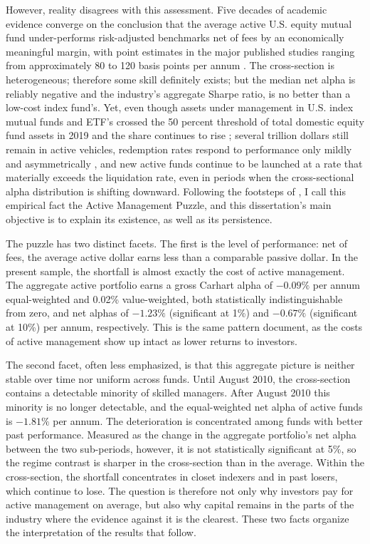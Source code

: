 \documentclass[12pt, oneside]{report}
\begin{document}
However, reality disagrees with this assessment. Five decades of academic evidence converge on the conclusion that the average active U.S. equity mutual fund under-performs risk-adjusted benchmarks net of fees by an economically meaningful margin, with point estimates in the major published studies ranging from approximately 80 to 120 basis points per annum \parencite{Jensen1968,Malkiel1995,Carhart1997,Wermers2000,FamaFrench2010,BarrasScailletWermers2010}.
The cross-section is heterogeneous; therefore some skill definitely exists; but the median net alpha is reliably negative and the 
industry's aggregate Sharpe ratio, is no better than a low-cost index fund's. Yet, even though assets under management in U.S. index mutual funds and ETF's crossed the 50 percent threshold of total domestic equity fund assets in 2019 and the share continues to rise \parencite{ICI2020}; several trillion dollars still remain in active vehicles, redemption rates respond to performance only mildly and asymmetrically \parencite{SirriTufano1998,ChevalierEllison1997}, and new active funds continue to be launched at a rate that materially exceeds the liquidation rate, even in periods when the cross-sectional alpha distribution is shifting downward. Following the footsteps of \textcite{Gruber1996}, I call this empirical fact the Active Management Puzzle, and this dissertation's main objective is to explain its existence, as well as its persistence.

The puzzle has two distinct facets. The first is the level of performance: net of fees, the average active dollar earns less than a comparable passive dollar. In the present sample, the shortfall is almost exactly the cost of active management. The aggregate active portfolio earns a gross Carhart alpha of $-0.09\%$ per annum equal-weighted and 0.02\% value-weighted, both statistically indistinguishable from zero, and net alphas of $-1.23\%$ (significant at 1\%) and $-0.67\%$ (significant at 10\%) per annum, respectively. This is the same pattern
\textcite{FamaFrench2010} document, as the costs of active management
show up intact as lower returns to investors. 

The second facet, often less emphasized, is that this aggregate picture is neither stable over time nor uniform across funds. Until August 2010, the cross-section contains a detectable minority of
skilled managers. After August 2010 this minority is no longer
detectable, and the equal-weighted net alpha of active funds is
$-1.81\%$ per annum. The deterioration is concentrated among funds with
better past performance. Measured as the change in the aggregate
portfolio's net alpha between the two sub-periods, however, it is not
statistically significant at 5\%, so the regime contrast is sharper in
the cross-section than in the average.
Within the cross-section, the shortfall concentrates in closet indexers
and in past losers, which continue to lose. The question is therefore not
only why investors pay for active management on average, but also why capital remains in the parts of the industry where the evidence against it is the clearest. These two facts organize the interpretation of the results that
follow.
\end{document}
